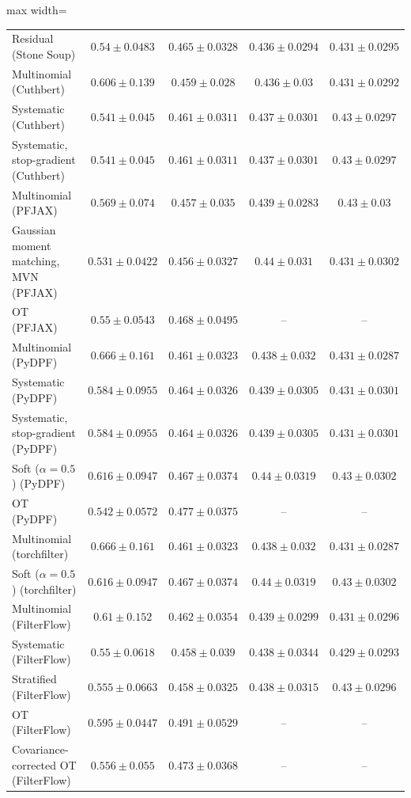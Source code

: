 \begin{table}[H]
\begin{adjustbox}{max width=\linewidth}
\begin{tabular}{lcccc}
Residual (Stone Soup) & $0.54\pm0.0483$ & $0.465\pm0.0328$ & $0.436\pm0.0294$ & $0.431\pm0.0295$ \\
Multinomial (Cuthbert) & $0.606\pm0.139$ & $0.459\pm0.028$ & $0.436\pm0.03$ & $0.431\pm0.0292$ \\
Systematic (Cuthbert) & $0.541\pm0.045$ & $0.461\pm0.0311$ & $0.437\pm0.0301$ & $0.43\pm0.0297$ \\
Systematic, stop-gradient (Cuthbert) & $0.541\pm0.045$ & $0.461\pm0.0311$ & $0.437\pm0.0301$ & $0.43\pm0.0297$ \\
Multinomial (PFJAX) & $0.569\pm0.074$ & $0.457\pm0.035$ & $0.439\pm0.0283$ & $0.43\pm0.03$ \\
Gaussian moment matching, MVN (PFJAX) & $\mathbf{0.531\pm0.0422}$ & $0.456\pm0.0327$ & $0.44\pm0.031$ & $0.431\pm0.0302$ \\
OT (PFJAX) & $0.55\pm0.0543$ & $0.468\pm0.0495$ & -- & -- \\
Multinomial (PyDPF) & $0.666\pm0.161$ & $0.461\pm0.0323$ & $0.438\pm0.032$ & $0.431\pm0.0287$ \\
Systematic (PyDPF) & $0.584\pm0.0955$ & $0.464\pm0.0326$ & $0.439\pm0.0305$ & $0.431\pm0.0301$ \\
Systematic, stop-gradient (PyDPF) & $0.584\pm0.0955$ & $0.464\pm0.0326$ & $0.439\pm0.0305$ & $0.431\pm0.0301$ \\
Soft ($\alpha{=}0.5$) (PyDPF) & $0.616\pm0.0947$ & $0.467\pm0.0374$ & $0.44\pm0.0319$ & $0.43\pm0.0302$ \\
OT (PyDPF) & $0.542\pm0.0572$ & $0.477\pm0.0375$ & -- & -- \\
Multinomial (torchfilter) & $0.666\pm0.161$ & $0.461\pm0.0323$ & $0.438\pm0.032$ & $0.431\pm0.0287$ \\
Soft ($\alpha{=}0.5$) (torchfilter) & $0.616\pm0.0947$ & $0.467\pm0.0374$ & $0.44\pm0.0319$ & $0.43\pm0.0302$ \\
Multinomial (FilterFlow) & $0.61\pm0.152$ & $0.462\pm0.0354$ & $0.439\pm0.0299$ & $0.431\pm0.0296$ \\
Systematic (FilterFlow) & $0.55\pm0.0618$ & $0.458\pm0.039$ & $0.438\pm0.0344$ & $0.429\pm0.0293$ \\
Stratified (FilterFlow) & $0.555\pm0.0663$ & $0.458\pm0.0325$ & $0.438\pm0.0315$ & $0.43\pm0.0296$ \\
OT (FilterFlow) & $0.595\pm0.0447$ & $0.491\pm0.0529$ & -- & -- \\
Covariance-corrected OT (FilterFlow) & $0.556\pm0.055$ & $0.473\pm0.0368$ & -- & -- \\

\end{tabular}
\end{adjustbox}
\end{table}
